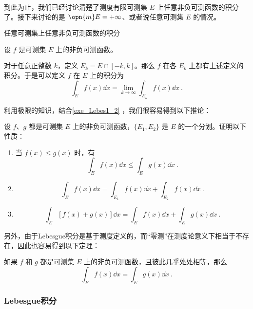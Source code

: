到此为止，我们已经讨论清楚了测度有限可测集 $E$ 上任意非负可测函数的积分了。接下来讨论的是 $\opn{m}E=+\infty$、或者说任意可测集 $E$ 的情况。

\begin{definition}{任意可测集上任意非负可测函数的积分}

设 $f$ 是可测集 $E$ 上的非负可测函数。

对于任意正整数 $k$，定义 $E_k=E\cap [-k, k]$。那么 $f$ 在各 $E_k$ 上都有上述定义的积分。于是可以定义 $f$ 在 $E$ 上的积分为
\begin{equation}
\int_E f(x) \dd x = \lim\limits_{k\to\infty}\int_{E_k} f(x) \dd x~.
\end{equation}

\end{definition}

利用极限的知识，结合\autoref{exe_Lebes1_2} ，我们很容易得到以下推论：

\begin{corollary}{}
设 $f$、$g$ 都是可测集 $E$ 上的非负可测函数，$\{E_1, E_2\}$ 是 $E$ 的一个分划。证明以下性质：
\begin{enumerate}
\item 当 $f(x)\leq g(x)$ 时，有
\begin{equation}
\int_E f(x) \dd x\leq \int_E g(x) \dd x~.
\end{equation}
\item 
\begin{equation}
\int_E f(x) \dd x=\int_{E_1} f(x) \dd x+\int_{E_2} f(x) \dd x~.
\end{equation}
\item 
\begin{equation}
\int_E [f(x)+g(x)] \dd x = \int_E f(x) \dd x+\int_E g(x) \dd x~.
\end{equation}
\end{enumerate}
\end{corollary}

另外，由于Lebesgue积分是基于测度定义的，而“零测”在测度论意义下相当于不存在，因此也容易得到以下定理：

\begin{theorem}{}
如果 $f$ 和 $g$ 都是可测集 $E$ 上的非负可测函数，且彼此几乎处处相等，那么
\begin{equation}
\int_E f(x) \dd x = \int_E g(x) \dd x~.
\end{equation}
\end{theorem}






\subsubsection{Lebesgue积分}

